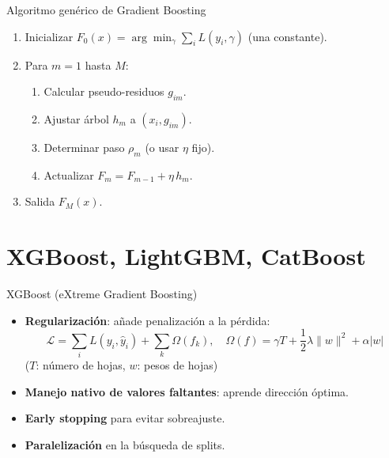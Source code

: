 \documentclass[aspectratio=169, 10pt, xcolor=table]{beamer}
\begin{document}
\begin{frame}{Algoritmo genérico de Gradient Boosting}
    \begin{enumerate}
        \item Inicializar $F_0(x) = \arg\min_\gamma \sum_i L(y_i, \gamma)$ (una constante).
        \item Para $m = 1$ hasta $M$:
            \begin{enumerate}
                \item Calcular pseudo-residuos $g_{im}$.
                \item Ajustar árbol $h_m$ a $(x_i, g_{im})$.
                \item Determinar paso $\rho_m$ (o usar $\eta$ fijo).
                \item Actualizar $F_m = F_{m-1} + \eta \, h_m$.
            \end{enumerate}
        \item Salida $F_M(x)$.
    \end{enumerate}
\end{frame}

\section{XGBoost, LightGBM, CatBoost}

\begin{frame}{XGBoost (eXtreme Gradient Boosting)}
    \begin{itemize}
        \item \textbf{Regularización}: añade penalización a la pérdida:
        \[
        \mathcal{L} = \sum_i L(y_i,\hat{y}_i) + \sum_k \Omega(f_k), \quad \Omega(f) = \gamma T + \frac{1}{2}\lambda\|w\|^2 + \alpha|w|
        \]
        ($T$: número de hojas, $w$: pesos de hojas)
        \item \textbf{Manejo nativo de valores faltantes}: aprende dirección óptima.
        \item \textbf{Early stopping} para evitar sobreajuste.
        \item \textbf{Paralelización} en la búsqueda de splits.
    \end{itemize}
\end{frame}
\end{document}
